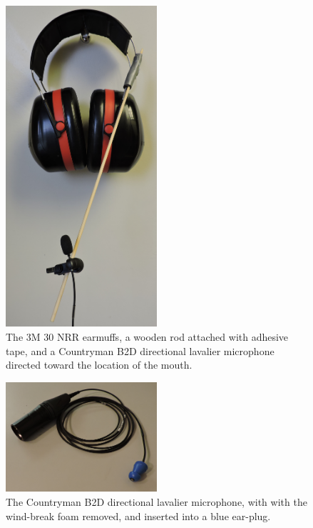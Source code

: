 \begin{figure}
\includegraphics[width=0.5\textwidth]{figure/earmuffSetup.JPG}
\caption{The 3M 30 NRR earmuffs, a wooden rod attached with adhesive tape, and a Countryman B2D directional lavalier microphone directed toward the location of the mouth.}
\label{fig:micInsertPlug}
\end{figure}

\begin{figure}
\includegraphics[width=0.5\textwidth]{figure/micInsertPlug.JPG}
\caption{The Countryman B2D directional lavalier microphone, with with the wind-break foam removed, and inserted into a blue ear-plug.}
\label{fig:earmuffSetup}
\end{figure}

